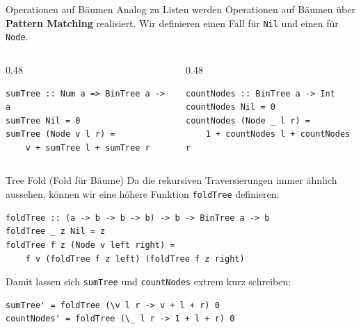 \documentclass[aspectratio=169,11pt]{beamer}
\begin{document}
\begin{frame}[fragile]{Operationen auf Bäumen}
    Analog zu Listen werden Operationen auf Bäumen über \textbf{Pattern Matching} realisiert. Wir definieren einen Fall für \texttt{Nil} und einen für \texttt{Node}.
    
    \begin{columns}[T]
        \begin{column}{0.48\textwidth}
            \begin{tcolorbox}[modernbox, title=Knotensumme]
\begin{lstlisting}
sumTree :: Num a => BinTree a -> a
sumTree Nil = 0
sumTree (Node v l r) = 
    v + sumTree l + sumTree r
\end{lstlisting}
            \end{tcolorbox}
        \end{column}
        \begin{column}{0.48\textwidth}
            \begin{tcolorbox}[modernbox, title=Knoten zählen]
\begin{lstlisting}
countNodes :: BinTree a -> Int
countNodes Nil = 0
countNodes (Node _ l r) = 
    1 + countNodes l + countNodes r
\end{lstlisting}
            \end{tcolorbox}
        \end{column}
    \end{columns}
\end{frame}

\begin{frame}[fragile]{Tree Fold (Fold für Bäume)}
    Da die rekursiven Traversierungen immer ähnlich aussehen, können wir eine höhere Funktion \texttt{foldTree} definieren:
    
    \begin{tcolorbox}[modernbox, title=\texttt{foldTree}]
\begin{lstlisting}
foldTree :: (a -> b -> b -> b) -> b -> BinTree a -> b
foldTree _ z Nil = z
foldTree f z (Node v left right) = 
    f v (foldTree f z left) (foldTree f z right)
\end{lstlisting}
    \end{tcolorbox}
    
    Damit lassen sich \texttt{sumTree} und \texttt{countNodes} extrem kurz schreiben:
\begin{lstlisting}
sumTree' = foldTree (\v l r -> v + l + r) 0
countNodes' = foldTree (\_ l r -> 1 + l + r) 0
\end{lstlisting}
\end{frame}
\end{document}
